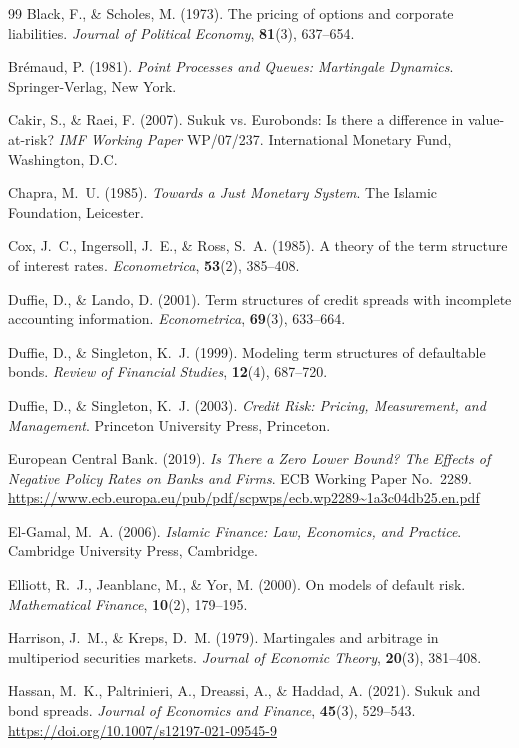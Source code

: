 \documentclass[10pt,twocolumn]{article}
\theoremstyle{plain}
\theoremstyle{definition}
\begin{document}
\begin{thebibliography}{99}
Black, F., \& Scholes, M. (1973).
The pricing of options and corporate liabilities.
\textit{Journal of Political Economy}, \textbf{81}(3), 637--654.

Brémaud, P. (1981).
\textit{Point Processes and Queues: Martingale Dynamics}.
Springer-Verlag, New York.

Cakir, S., \& Raei, F. (2007).
Sukuk vs. Eurobonds: Is there a difference in value-at-risk?
\textit{IMF Working Paper} WP/07/237.
International Monetary Fund, Washington, D.C.

Chapra, M.~U. (1985).
\textit{Towards a Just Monetary System}.
The Islamic Foundation, Leicester.

Cox, J.~C., Ingersoll, J.~E., \& Ross, S.~A. (1985).
A theory of the term structure of interest rates.
\textit{Econometrica}, \textbf{53}(2), 385--408.

Duffie, D., \& Lando, D. (2001).
Term structures of credit spreads with incomplete accounting
information.
\textit{Econometrica}, \textbf{69}(3), 633--664.

Duffie, D., \& Singleton, K.~J. (1999).
Modeling term structures of defaultable bonds.
\textit{Review of Financial Studies}, \textbf{12}(4), 687--720.

Duffie, D., \& Singleton, K.~J. (2003).
\textit{Credit Risk: Pricing, Measurement, and Management}.
Princeton University Press, Princeton.

European Central Bank. (2019).
\textit{Is There a Zero Lower Bound? The Effects of Negative
Policy Rates on Banks and Firms}.
ECB Working Paper No.~2289.
\url{https://www.ecb.europa.eu/pub/pdf/scpwps/ecb.wp2289~1a3c04db25.en.pdf}

El-Gamal, M.~A. (2006).
\textit{Islamic Finance: Law, Economics, and Practice}.
Cambridge University Press, Cambridge.

Elliott, R.~J., Jeanblanc, M., \& Yor, M. (2000).
On models of default risk.
\textit{Mathematical Finance}, \textbf{10}(2), 179--195.

Harrison, J.~M., \& Kreps, D.~M. (1979).
Martingales and arbitrage in multiperiod securities markets.
\textit{Journal of Economic Theory}, \textbf{20}(3), 381--408.

Hassan, M.~K., Paltrinieri, A., Dreassi, A., \& Haddad, A. (2021).
Sukuk and bond spreads.
\textit{Journal of Economics and Finance}, \textbf{45}(3), 529--543.
\url{https://doi.org/10.1007/s12197-021-09545-9}


\end{thebibliography}
\end{document}
